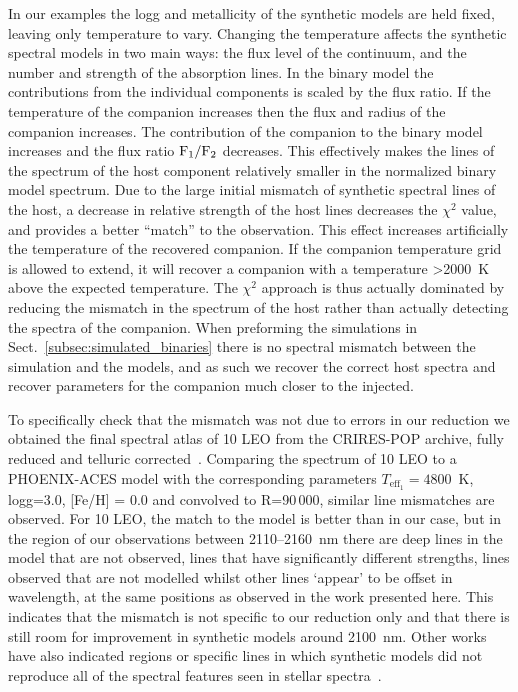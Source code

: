 \documentclass[fleqn,usenatbib]{mnras}
\newcommand*\bl{\color{blue}}
\begin{document}
    In our examples the logg and metallicity of the synthetic models are held fixed, leaving only temperature to vary. {\bl Changing the temperature affects} the synthetic spectral models in two main ways: the flux level of the continuum, and the number and strength of the absorption lines. In the binary model the contributions from the individual components is scaled by the flux ratio. If the temperature of the companion increases then the flux and radius of the companion increases. The contribution of the companion to the binary model increases and the flux ratio \(\rm F_1/F_2\) decreases. This effectively makes the lines of the spectrum of the host component relatively smaller in the normalized binary model spectrum. Due to the large initial mismatch of synthetic spectral lines of the host, a decrease in relative strength of the host lines decreases the \(\chi^2\) value, and provides a better ``match'' to the observation. {\bl This effect increases artificially the temperature of the recovered companion}. If the companion temperature grid is allowed to extend, it will recover a companion with a temperature >2000~K above the expected temperature. The \(\chi^2\) approach is thus actually dominated by reducing the mismatch in the spectrum of the host rather than actually detecting the spectra of the companion. When preforming the simulations in Sect.~\ref{subsec:simulated_binaries} there is no spectral mismatch between the simulation and the models, {\bl and as such we recover the correct host spectra and recover parameters for the companion much closer to the injected}.
    
    {\bl To specifically check that the mismatch was not due to errors in our reduction we obtained the final spectral atlas of {10 LEO} from the CRIRES-POP archive, fully reduced and telluric corrected~\citep{nicholls_crirespop_2017}. Comparing the spectrum of {10 LEO} to a PHOENIX-ACES model with the corresponding parameters \(T_{\textrm{eff}_1}=4800\)~K, logg=3.0, [Fe/H] = 0.0 and convolved to R=90\,000, similar line mismatches are observed. For 10 LEO, the match to the model is better than in our case, but in the region of our observations between 2110--2160~nm there are deep lines in the model that are not observed, lines that have significantly different strengths, lines observed that are not modelled whilst other lines `appear' to be offset in wavelength, at the same positions as observed in the work presented here. This indicates that the mismatch is not specific to our reduction only and that there is still room for improvement in synthetic models around 2100~nm. Other works have also indicated regions or specific lines in which synthetic models did not reproduce all of the spectral features seen in stellar spectra~\citep[e.g.][]{delburgo_physical_2009, bonnefoy_library_2014, passegger_spectroscopic_2016, rajpurohit_spectral_2016}.}
    
\end{document}
